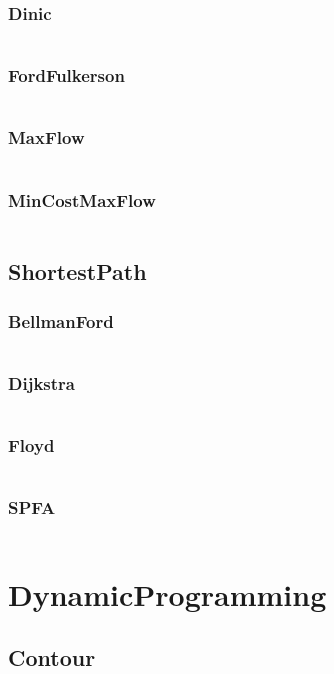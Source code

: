 \documentclass[a4paper,11pt]{article}
\begin{document}
\subsubsection{Dinic}
\inputminted[breaklines]{c++}{04++GraphTheory/+NetFlow/+Dinic.cpp}
\subsubsection{FordFulkerson}
\inputminted[breaklines]{c++}{04++GraphTheory/+NetFlow/+FordFulkerson.cpp}
\subsubsection{MaxFlow}
\inputminted[breaklines]{c++}{04++GraphTheory/+NetFlow/+MaxFlow.cpp}
\subsubsection{MinCostMaxFlow}
\inputminted[breaklines]{c++}{04++GraphTheory/+NetFlow/+MinCostMaxFlow.cpp}

\subsection{ShortestPath}
\subsubsection{BellmanFord}
\inputminted[breaklines]{c++}{04++GraphTheory/+ShortestPath/+BellmanFord.cpp}
\subsubsection{Dijkstra}
\inputminted[breaklines]{c++}{04++GraphTheory/+ShortestPath/+Dijkstra.cpp}
\subsubsection{Floyd}
\inputminted[breaklines]{c++}{04++GraphTheory/+ShortestPath/+Floyd.cpp}
\subsubsection{SPFA}
\inputminted[breaklines]{c++}{04++GraphTheory/+ShortestPath/+SPFA.cpp}


\newpage
\section{DynamicProgramming}
\subsection{Contour}
\inputminted[breaklines]{c++}{05++DynamicProgramming/+Contour.cpp}
\end{document}

